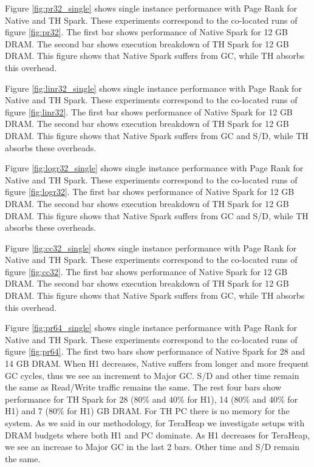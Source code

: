 Figure \ref{fig:pr32_single} shows single instance performance with Page Rank for Native and TH Spark. These experiments correspond to the co-located runs of figure \ref{fig:pr32}. The first bar shows performance of Native Spark for 12 GB DRAM. The second bar shows execution breakdown of TH Spark for 12 GB DRAM. This figure shows that Native Spark suffers from GC, while TH absorbs this overhead.

Figure \ref{fig:linr32_single} shows single instance performance with Page Rank for Native and TH Spark. These experiments correspond to the co-located runs of figure \ref{fig:linr32}. The first bar shows performance of Native Spark for 12 GB DRAM. The second bar shows execution breakdown of TH Spark for 12 GB DRAM. This figure shows that Native Spark suffers from GC and S/D, while TH absorbs these overheads.

Figure \ref{fig:logr32_single} shows single instance performance with Page Rank for Native and TH Spark. These experiments correspond to the co-located runs of figure \ref{fig:logr32}. The first bar shows performance of Native Spark for 12 GB DRAM. The second bar shows execution breakdown of TH Spark for 12 GB DRAM. This figure shows that Native Spark suffers from GC and S/D, while TH absorbs these overheads.

Figure \ref{fig:cc32_single} shows single instance performance with Page Rank for Native and TH Spark. These experiments correspond to the co-located runs of figure \ref{fig:cc32}. The first bar shows performance of Native Spark for 12 GB DRAM. The second bar shows execution breakdown of TH Spark for 12 GB DRAM. This figure shows that Native Spark suffers from GC, while TH absorbs this overhead.

Figure \ref{fig:pr64_single} shows single instance performance with Page Rank for Native and TH Spark. These experiments correspond to the co-located runs of figure \ref{fig:pr64}. The first two bars show performance of Native Spark for 28 and 14 GB DRAM. When H1 decreases, Native suffers from longer and more frequent GC cycles, thus we see an increment to Major GC. S/D and other time remain the same as Read/Write traffic remains the same. The rest four bars show performance for TH Spark for 28 (80\% and 40\% for H1), 14 (80\% and 40\% for H1) and 7 (80\% for H1) GB DRAM. For TH PC there is no memory for the system. As we said in our methodology, for TeraHeap we investigate setups with DRAM budgets where both H1 and PC dominate. As H1 decreases for TeraHeap, we see an increase to Major GC in the last 2 bars. Other time and S/D remain the same.

